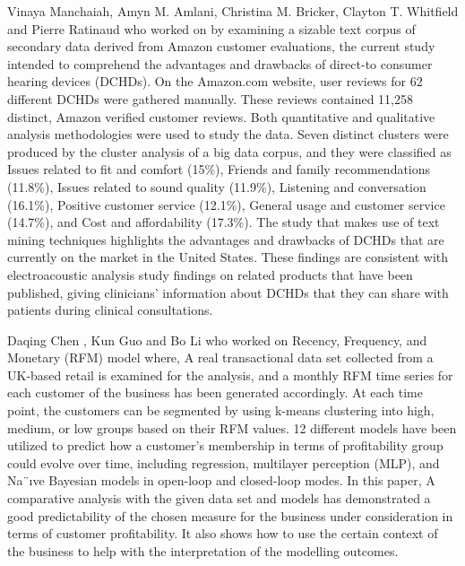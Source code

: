 \documentclass[conference]{IEEEtran}
\begin{document}
Vinaya Manchaiah, Amyn M. Amlani, Christina M. Bricker, Clayton T. Whitfield and Pierre Ratinaud \cite{b11} who worked on by examining a sizable text corpus of secondary data derived from Amazon customer evaluations, the current study intended to comprehend the advantages and drawbacks of direct-to consumer hearing devices (DCHDs). On the Amazon.com website, user reviews for 62 different DCHDs were gathered manually. These reviews contained 11,258 distinct, Amazon verified customer reviews. Both quantitative and qualitative analysis methodologies were used to study the data. Seven distinct clusters were produced by the cluster analysis of a big data corpus, and they were classified as Issues related to fit and comfort (15\%), Friends and family recommendations (11.8\%), Issues related to sound quality (11.9\%), Listening and conversation (16.1\%), Positive customer service (12.1\%), General usage and customer service (14.7\%), and Cost and affordability (17.3\%). The study that makes use of text mining techniques highlights the advantages and drawbacks of DCHDs that are currently on the market in the United States. These findings are consistent with electroacoustic analysis study findings on related products that have been published, giving clinicians’ information about DCHDs that they can share with patients during clinical consultations.

Daqing Chen , Kun Guo and Bo Li \cite{b10} who worked on Recency, Frequency, and Monetary (RFM) model where, A real transactional data set collected from a UK-based retail is examined for the analysis, and a monthly RFM time series for each customer of the business has been generated accordingly. At each time point, the customers can be segmented by using k-means clustering into high, medium, or low groups based on their RFM values. 12 different models have been utilized to predict how a customer’s membership in terms of profitability group could evolve over time, including regression, multilayer perception (MLP), and Na¨ıve Bayesian models in open-loop and closed-loop modes. In this paper, A comparative analysis with the given data set and models has demonstrated a good predictability of the chosen measure for the business under consideration in terms of customer profitability. It also shows how to use the certain context of the business to help with the interpretation of the modelling outcomes.
\end{document}
